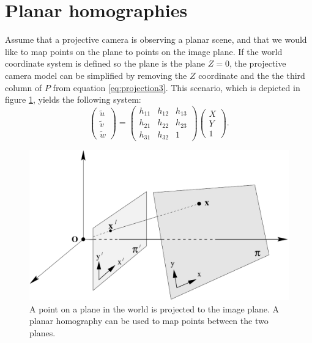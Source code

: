 \section{Planar homographies}\label{planar-homographies}
Assume that a projective camera is observing a planar scene, and that we would like to map points on the plane to points on the image plane. 
If the world coordinate system is defined so the plane is the plane $Z=0$, the projective camera model can be simplified by removing the $Z$ coordinate and the the third column of $P$ from equation \ref{eq:projection3}. 
This scenario, which is depicted in figure \ref{fig:planar_homography}, yields the following system:
\begin{equation}\label{eq:homography}
\begin{pmatrix} \tilde{u} \\ \tilde{v} \\ \tilde{w} \end{pmatrix} =
\begin{pmatrix} h_{11} & h_{12} & h_{13}  \\
 				h_{21} & h_{22} & h_{23}  \\
				h_{31} & h_{32} & 1\end{pmatrix}
\begin{pmatrix}X \\Y \\ 1\end{pmatrix}.
\end{equation}

\begin{figure}
\begin{center}
\includegraphics[width=1.0\textwidth]{figures/planar_homography.pdf}
\end{center}
\caption[Illustration of planar homographies]{A point on a plane in the world is projected to the image plane. A planar homography can be used to map points between the two planes.}
\label{fig:planar_homography}
\end{figure}

